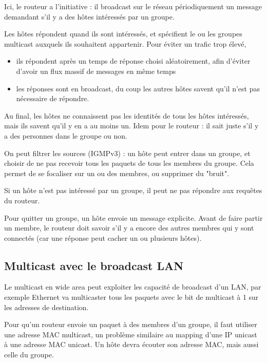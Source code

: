 		Ici, le routeur a l'initiative : il broadcast sur le réseau périodiquement un message demandant s'il y a des hôtes intéressés par un groupe.
	
		Les hôtes répondent quand ils sont intéressés, et spécifient le ou les groupes multicast auxquels ils souhaitent appartenir. Pour éviter un trafic trop élevé,
	
		\begin{itemize}
			\item ils répondent après un temps de réponse choisi aléatoirement, afin d'éviter d'avoir un flux massif de messages en même temps
			\item les réponses sont en broadcast, du coup les autres hôtes savent qu'il n'est pas nécessaire de répondre.
		\end{itemize}
	
		Au final, les hôtes ne connaissent pas les identités de tous les hôtes intéressés, mais ils savent qu'il y en a au moins un. Idem pour le routeur : il sait juste s'il y a des personnes dans le groupe ou non.
	
	
		On peut filtrer les sources (IGMPv3) : un hôte peut entrer dans un groupe, et choisir de ne pas recevoir tous les paquets de tous les membres du groupe. Cela permet de se focaliser sur un ou des membres, ou supprimer du "bruit".
	
		Si un hôte n'est pas intéressé par un groupe, il peut ne pas répondre aux requêtes du routeur.
	
		Pour quitter un groupe, un hôte envoie un message explicite. Avant de faire partir un membre, le routeur doit savoir s'il y a encore des autres membres qui y sont connectés (car une réponse peut cacher un ou plusieurs hôtes).
	
		\subsection{Multicast avec le broadcast LAN}
		
		Le multicast en wide area peut exploiter les capacité de broadcast d'un LAN, par exemple Ethernet va multicaster tous les paquets avec le bit de multicast à 1 sur les adresses de destination.
		
		Pour qu'un routeur envoie un paquet à des membres d'un groupe, il faut utiliser une adresse MAC multicast, un problème similaire au mapping d'une IP unicast à une adresse MAC unicast. Un hôte devra écouter son adresse MAC, mais aussi celle du groupe.
	
